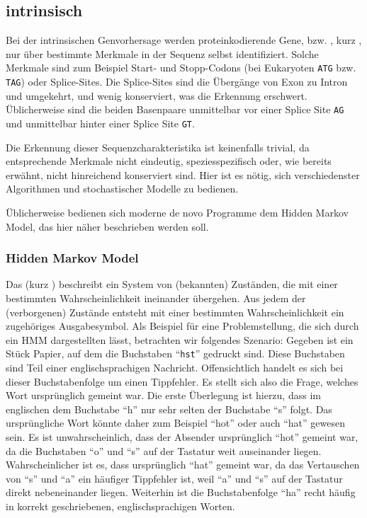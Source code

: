 \subsection{intrinsisch }
Bei der intrinsischen Genvorhersage werden proteinkodierende Gene, bzw.
, kurz , nur über bestimmte Merkmale in
der Sequenz selbst identifiziert.
Solche Merkmale sind zum Beispiel Start- und Stopp-Codons (bei
Eukaryoten \texttt{ATG} bzw. \texttt{TAG}) oder Splice-Sites.
Die Splice-Sites sind die Übergänge von Exon zu Intron und umgekehrt, und wenig
konserviert, was die Erkennung erschwert.
Üblicherweise sind die beiden Basenpaare unmittelbar vor einer
Splice Site \texttt{AG} und unmittelbar hinter einer Splice Site \texttt{GT}.

Die Erkennung dieser Sequenzcharakteristika ist keinenfalls trivial, da entsprechende
Merkmale nicht eindeutig, speziesspezifisch oder, wie bereits erwähnt, nicht
hinreichend konserviert sind.
Hier ist es nötig, sich verschiedenster Algorithmen und stochastischer
Modelle zu bedienen.

Üblicherweise bedienen sich moderne de novo  Programme dem Hidden
Markov Model, das hier näher beschrieben werden soll.

\subsubsection{Hidden Markov Model }
Das  (kurz )
beschreibt ein System von (bekannten) Zuständen, die mit einer bestimmten
Wahrscheinlichkeit ineinander übergehen.
Aus jedem der (verborgenen) Zustände entsteht mit einer
bestimmten Wahrscheinlichkeit ein zugehöriges Ausgabesymbol.
Als Beispiel für eine Problemstellung, die sich durch ein HMM dargestellten
lässt, betrachten wir folgendes Szenario:
Gegeben ist ein Stück Papier, auf dem die Buchstaben \enquote{\texttt{hst}}
gedruckt sind.
Diese Buchstaben sind Teil einer englischsprachigen Nachricht.
Offensichtlich handelt es sich bei dieser Buchstabenfolge um einen Tippfehler.
Es stellt sich also die Frage, welches Wort ursprünglich gemeint war.
Die erste Überlegung ist hierzu, dass im englischen dem Buchstabe \enquote{h}
nur sehr selten der Buchstabe \enquote{s} folgt.
Das ursprüngliche Wort könnte daher zum Beispiel \enquote{hot} oder auch
\enquote{hat} gewesen sein.
Es ist unwahrscheinlich, dass der Absender ursprünglich \enquote{hot} gemeint
war, da die Buchstaben \enquote{o} und \enquote{s} auf der Tastatur weit
auseinander liegen.
Wahrscheinlicher ist es, dass ursprünglich \enquote{hat} gemeint war, da das
Vertauschen von \enquote{s} und \enquote{a} ein häufiger Tippfehler ist, weil
\enquote{a} und \enquote{s} auf der Tastatur direkt nebeneinander liegen.
Weiterhin ist die Buchstabenfolge \enquote{ha} recht häufig in korrekt
geschriebenen, englischsprachigen Worten.

